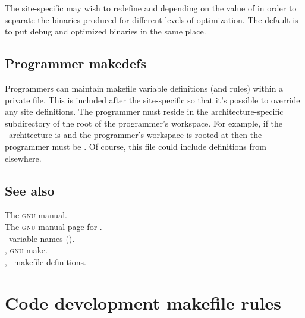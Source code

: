 The site-specific  may wish to redefine  and
 depending on the value of  in order to separate the
binaries produced for different levels of optimization.  The default is to put
debug and optimized binaries in the same place.

\subsection*{Programmer makedefs}

Programmers can maintain makefile variable definitions (and rules) within a
private  file.  This is included after the site-specific
 so that it's possible to override any site definitions.  The
programmer  must reside in the architecture-specific
subdirectory of the root of the programmer's workspace.  For example, if the
\aipspp\ architecture is  and the programmer's workspace is
rooted at  then the programmer  must be
.  Of course, this file could
include  definitions from elsewhere.

\subsection*{See also}
 
The \textsc{gnu}  manual.\\
The \textsc{gnu} manual page for .\\
\aipspp\ variable names ().\\
, \textsc{gnu} make.\\
, \aipspp\ makefile definitions.
 

\newpage
\section{Code development makefile rules}
\label{Code development makefile rules}

